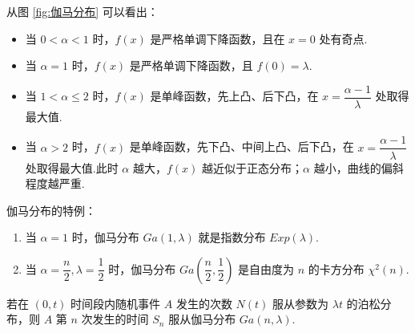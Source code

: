 从图 \ref{fig:伽马分布} 可以看出：
\begin{itemize}
    \item 当 $0 < \alpha < 1$ 时，$f(x)$ 是严格单调下降函数，且在 $x=0$ 处有奇点.
    \item 当 $\alpha = 1$ 时，$f(x)$ 是严格单调下降函数，且 $f(0) = \lambda$.
    \item 当 $1 < \alpha \leqslant 2$ 时，$f(x)$ 是单峰函数，先上凸、后下凸，在 $x = \dfrac{\alpha - 1}{\lambda}$ 处取得最大值.
    \item 当 $\alpha > 2$ 时，$f(x)$ 是单峰函数，先下凸、中间上凸、后下凸，在 $x = \dfrac{\alpha - 1}{\lambda}$ 处取得最大值.此时 $\alpha$ 越大，$f(x)$ 越近似于正态分布；$\alpha$ 越小，曲线的偏斜程度越严重.
\end{itemize}

伽马分布的特例：
\begin{enumerate}
    \item 当 $\alpha = 1$ 时，伽马分布 $Ga(1, \lambda)$ 就是指数分布 $Exp(\lambda)$.
    \item 当 $\alpha = \dfrac{n}{2}, \lambda = \dfrac{1}{2}$ 时，伽马分布 $Ga(\dfrac{n}{2}, \dfrac{1}{2})$ 是自由度为 $n$ 的卡方分布 $\chi^2(n)$.
\end{enumerate}

\begin{conclusion}[][泊松分布与伽马分布的关系]
    \indent 若在 $(0,t)$ 时间段内随机事件 $A$ 发生的次数 $N(t)$ 服从参数为 $\lambda t$ 的泊松分布，则 $A$ 第 $n$ 次发生的时间 $S_n$ 服从伽马分布 $Ga(n, \lambda)$.
\end{conclusion}

